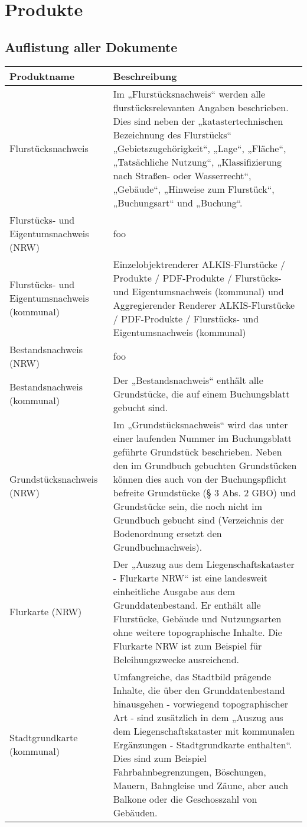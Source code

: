 \chapter{Produkte}

\section{Auflistung aller Dokumente}
\begin{longtable}{|p{}|p{}|}
\hline 
Produktname & Beschreibung \\ 
\hline 
\endhead
Flurstücksnachweis
&
Im „Flurstücksnachweis“ werden alle flurstücksrelevanten Angaben beschrieben. Dies sind
neben der „katastertechnischen Bezeichnung des Flurstücks“ „Gebietszugehörigkeit“, „Lage“,
„Fläche“, „Tatsächliche Nutzung“, „Klassifizierung nach Straßen- oder Wasserrecht“, „Gebäude“, „Hinweise zum Flurstück“, „Buchungsart“ und „Buchung“. \autocite{adv-alkis-erlaeuterung} \\ 
\hline
Flurstücks- und Eigentumsnachweis (NRW)
&
foo \\
\hline
Flurstücks- und Eigentumsnachweis (kommunal)
&
Einzelobjektrenderer ALKIS-Flurstücke / Produkte / PDF-Produkte / Flurstücks- und Eigentumsnachweis (kommunal) und Aggregierender Renderer ALKIS-Flurstücke / PDF-Produkte / Flurstücks- und Eigentumsnachweis (kommunal) \\
\hline
Bestandsnachweis (NRW)
&
foo \\
\hline
Bestandsnachweis (kommunal)
&
Der „Bestandsnachweis“ enthält alle Grundstücke, die auf einem Buchungsblatt gebucht sind. \\
\hline
Grundstücksnachweis (NRW)
&
Im „Grundstücksnachweis“ wird das unter einer laufenden Nummer im Buchungsblatt geführte Grundstück beschrieben. Neben den im Grundbuch gebuchten Grundstücken können
dies auch von der Buchungspflicht befreite Grundstücke (§ 3 Abs. 2 GBO) und Grundstücke
sein, die noch nicht im Grundbuch gebucht sind (Verzeichnis der Bodenordnung ersetzt den
Grundbuchnachweis). \autocite{adv-alkis-erlaeuterung}\\
\hline
Flurkarte (NRW)
&
Der „Auszug aus dem Liegenschaftskataster - Flurkarte NRW“  ist eine landesweit einheitliche Ausgabe aus dem Grunddatenbestand. Er enthält alle Flurstücke, Gebäude und Nutzungsarten ohne weitere topographische Inhalte. Die Flurkarte NRW ist zum Beispiel für Beleihungszwecke ausreichend. \autocite{wupp-alkis} \\
\hline
Stadtgrundkarte (kommunal)
&
Umfangreiche, das Stadtbild prägende Inhalte, die über den Grunddatenbestand hinausgehen - vorwiegend topographischer Art - sind zusätzlich in dem „Auszug aus dem Liegenschaftskataster mit kommunalen Ergänzungen - Stadtgrundkarte enthalten“.
Dies sind zum Beispiel Fahrbahnbegrenzungen, Böschungen, Mauern, Bahngleise und Zäune, aber auch Balkone oder die Geschosszahl von Gebäuden. 


\end{longtable}
